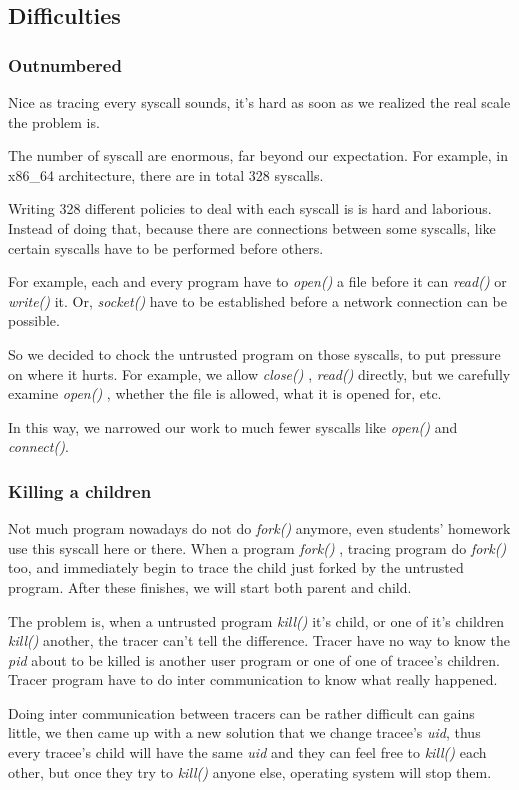 \documentclass[conference,compsoc]{IEEEtran}
\begin{document}
	\subsection{Difficulties}
		\subsubsection{Outnumbered}
			\par
				Nice as tracing every syscall sounds, it's hard as soon as we realized the real scale the problem is. 
			\par 
				The number of syscall are enormous, far beyond our expectation. 
				For example, in x86\_64 architecture, there are in total 328 syscalls. 
				\par
				Writing 328 different policies to deal with each syscall is is hard and laborious. Instead of doing that, because there are connections between some syscalls, like certain syscalls have to be performed before others.
				\par
				For example, each and every program have to \emph{ open() } a file before it can \emph{read()} or \emph{write()} it. 
				Or, \emph{ socket() } have to be established before a network connection can be possible.
			\par
				So we decided to chock the untrusted program on those syscalls, to put pressure on where it hurts. 
				For example, we allow \emph{ close() }, \emph{ read() } directly, but we carefully examine \emph{ open() }, whether the file is allowed, what it is opened for, etc.
			\par 
				In this way, we narrowed our work to much fewer syscalls like \emph{open()} and \emph{connect()}.
		\subsubsection{Killing a children}
			\par 
				Not much program nowadays do not do \emph{ fork() } anymore, even students' homework use this syscall here or there. 
				When a program \emph{ fork() }, tracing program do \emph{ fork() } too, and immediately begin to trace the child just forked by the untrusted program. 
				After these finishes, we will start both parent and child.
			\par
				The problem is, when a untrusted program \emph{kill()} it's child, or one of it's children \emph{kill()} another, the tracer can't tell the difference. 
				Tracer have no way to know the \emph{pid} about to be killed is another user program or one of one of tracee's children. 
				Tracer program have to do inter communication to know what really happened.
			\par
				Doing inter communication between tracers can be rather difficult can gains little, we then came up with a new solution that we change tracee's \emph{uid}, thus every tracee's child will have the same \emph{uid} and they can feel free to \emph{kill()} each other, but once they try to \emph{kill()} anyone else, operating system will stop them.
\end{document}
